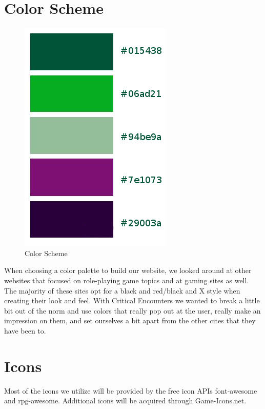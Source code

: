 \documentclass[12pt,a4paper]{report}
\begin{document}
	\section{Color Scheme}
	\begin{figure}[H]
		\centering
		\includegraphics[scale=.5]{colors}
		\caption{Color Scheme}
		\label{fig: Color Scheme}
	\end{figure}
	When choosing a color palette to build our website, we looked around at other websites that focused on role-playing game topics and at gaming sites as well. The majority of these sites opt for a black and red/black and X style when creating their look and feel. With Critical Encounters we wanted to break a little bit out of the norm and use colors that really pop out at the user, really make an impression on them, and set ourselves a bit apart from the other cites that they have been to.
	\newpage
	\section{Icons}
	Most of the icons we utilize will be provided by the free icon APIs font-awesome and rpg-awesome. Additional icons will be acquired through Game-Icons.net.
\end{document}
